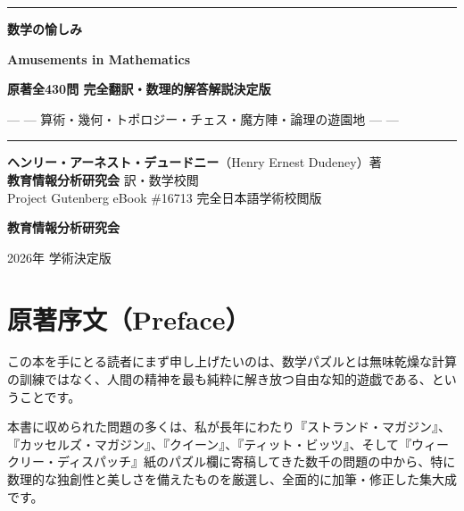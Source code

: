 \documentclass[10pt,a4paper,oneside,openany]{ltjsbook}
\begin{document}
\begin{titlepage}
\centering
\vspace*{1.5cm}
{\color{primaryblue}\rule{\textwidth}{2pt}}\par
\vspace{1.0cm}
{\Huge\textbf{数学の愉しみ}\par}
\vspace{0.4cm}
{\huge\textbf{Amusements in Mathematics}\par}
\vspace{0.6cm}
{\Large\textbf{原著全430問 完全翻訳・数理的解答解説決定版}\par}
\vspace{0.8cm}
{\large — — 算術・幾何・トポロジー・チェス・魔方陣・論理の遊園地 — —\par}
\vspace{1.0cm}
{\color{accentcrimson}\rule{0.6\textwidth}{1.5pt}}\par
\vspace{2.0cm}

\begin{tcolorbox}[colback=softblue,colframe=primaryblue,width=0.85\textwidth,arc=3mm,boxrule=1.2pt]
\centering\large
\textbf{ヘンリー・アーネスト・デュードニー}（Henry Ernest Dudeney）著\\
\textbf{教育情報分析研究会} 訳・数学校閲\\
\vspace{0.5em}
\normalsize
Project Gutenberg eBook \#16713 完全日本語学術校閲版
\end{tcolorbox}

\vfill
{\Large\textbf{教育情報分析研究会}\par}
\vspace{0.3cm}
{\large 2026年 学術決定版\par}
\vspace{1.0cm}
\end{titlepage}

\frontmatter
\chapter*{原著序文（Preface）}

この本を手にとる読者にまず申し上げたいのは、数学パズルとは無味乾燥な計算の訓練ではなく、人間の精神を最も純粋に解き放つ自由な知的遊戯である、ということです。

本書に収められた問題の多くは、私が長年にわたり『ストランド・マガジン』、『カッセルズ・マガジン』、『クイーン』、『ティット・ビッツ』、そして『ウィークリー・ディスパッチ』紙のパズル欄に寄稿してきた数千の問題の中から、特に数理的な独創性と美しさを備えたものを厳選し、全面的に加筆・修正した集大成です。
\end{document}
